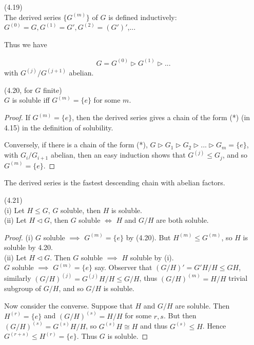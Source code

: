 \documentclass[a4paper]{article}
\begin{document}
\begin{defi} (4.19)\\
The derived series $\{G^{(m)}\}$ of $G$ is defined inductively: $G^{(0)} =G, G^{(1)} = G',G^{(2)} = (G')'$,...

Thus we have

\begin{equation*}
\begin{aligned}
G = G^{(0)} \triangleright G^{(1)} \triangleright ...
\end{aligned}
\end{equation*}
with $G^{(j)} / G^{(j+1)}$ abelian.
\end{defi}

\begin{lemma} (4.20, for $G$ finite)\\
$G$ is soluble iff $G^{(m)} = \{e\}$ for some $m$.
\begin{proof}
If $G^{(m)} = \{e\}$, then the derived series gives a chain of the form (*) (in 4.15) in the definition of solubility.

Conversely, if there is a chain of the form (*), $G \triangleright G_1 \triangleright G_2 \triangleright ... \triangleright G_m = \{e\}$, with $G_i / G_{i+1}$ abelian, then an easy induction shows that $G^{(j)} \leq G_j$, and so $G^{(m)} = \{e\}$.
\end{proof}
\end{lemma}

\begin{rem}
The derived series is the fastest descending chain with abelian factors.
\end{rem}

\begin{lemma} (4.21)\\
(i) Let $H \leq G$, $G$ soluble, then $H$ is soluble.\\
(ii) Let $H \triangleleft G$, then $G$ soluble $\iff$ $H$ and $G/H$ are both soluble.
\begin{proof}
(i) $G$ soluble $\implies$ $G^{(m)} = \{e\}$ by (4.20). But $H^{(m)} \leq G^{(m)}$, so $H$ is soluble by 4.20.\\
(ii) Let $H \triangleleft G$. Then $G$ soluble $\implies$ $H$ soluble by (i).\\
$G$ soluble $\implies$ $G^{(m)} = \{e\}$ say. Observer that $(G/H)' = G'H/H \leq GH$, similarly $(G/H)^{(j)} = G^{(j)} H/H \leq G/H$, thus $(G/H)^{(m)} = H/H$ trivial subgroup of $G/H$, and so $G/H$ is soluble.

Now consider the converse. Suppose that $H$ and $G/H$ are soluble. Then $H^{(r)} = \{e\}$ and $(G/H)^{(s)} = H/H$ for some $r,s$. But then $(G/H)^{(s)} = G^{(s)} H/H$, so $G^{(s)} H \cong H$ and thus $G^{(s)} \leq H$. Hence $G^{(r+s)} \leq H^{(r)} = \{e\}$. Thus $G$ is soluble.
\end{proof}
\end{lemma}
\end{document}
